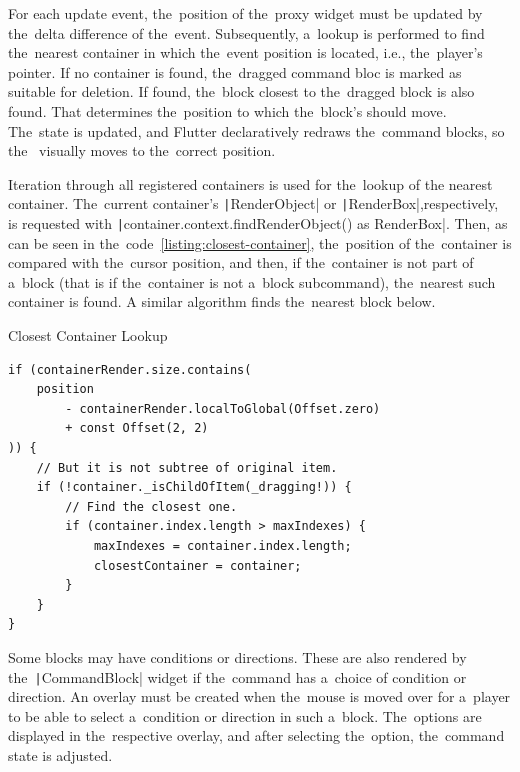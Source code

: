 For each update event, the~position of the~proxy widget must be updated by the~delta difference of the~event.
Subsequently, a~lookup is performed to find the~nearest container in which the~event position is located, i.e., the~player's pointer.
If no container is found, the~dragged command bloc is marked as suitable for deletion.
If found, the~block closest to the~dragged block is also found.
That determines the~position to which the~block's  should move.
The~state is updated, and Flutter declaratively redraws the~command blocks, so the~ visually moves to the~correct position.

\pagebreak

Iteration through all registered containers is used for the~lookup of the nearest container.
The~current container's \texttt|RenderObject| or \texttt|RenderBox|,\linebreak{}respectively, is requested with \texttt|container.context.findRenderObject() as RenderBox|.
Then, as can be seen in the~code~\ref{listing:closest-container}, the~position of the~container is compared with the~cursor position, and then, if the~container is not part of a~block (that is if the~container is not a~block subcommand), the~nearest such container is found.
A similar algorithm finds the~nearest block below.

\begin{listing}
    \caption{Closest Container Lookup}
    \label{listing:closest-container}
    \begin{verbatim}
if (containerRender.size.contains(
    position 
        - containerRender.localToGlobal(Offset.zero) 
        + const Offset(2, 2)
)) {
    // But it is not subtree of original item.
    if (!container._isChildOfItem(_dragging!)) {
        // Find the closest one.
        if (container.index.length > maxIndexes) {
            maxIndexes = container.index.length;
            closestContainer = container;
        }
    }
}
    \end{verbatim}
\end{listing}

Some blocks may have conditions or directions.
These are also rendered by the~\texttt|CommandBlock| widget if the~command has a~choice of condition or direction.
An overlay must be created when the~mouse is moved over for a~player to be able to select a~condition or direction in such a~block.
The~options are displayed in the~respective overlay, and after selecting the~option, the~command state is adjusted.


